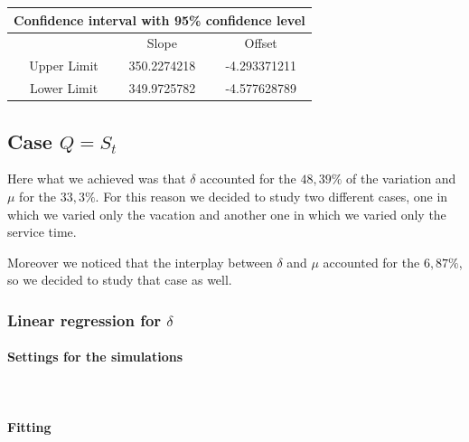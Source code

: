 \documentclass{article}
\begin{document}
                    \begin{table}[htbp]
                        \centering 
                        \begin{tabular}{|c|c|c|}
                            
                            \hline
                            \multicolumn{3}{|c|}{\bf Confidence interval with 95\% confidence level} \\
                            
                            \hline
                            \ & Slope & Offset\\
                            \hline
                            \ Upper Limit & 350.2274218 & -4.293371211 \\ 
                            \hline
                            \ Lower Limit & 349.9725782 & -4.577628789 \\ 
                            \hline
                        \end{tabular}
                        \label{table:CI_05_fitting}
                    \end{table}
    \newpage            
        \subsection{Case $Q = S_t$}
            Here what we achieved was that $\delta$ accounted for the $48,39\%$ of the variation and $\mu$ for the $33,3\%$. For this reason we decided to study two different cases, one in which we varied only the vacation and another one in which we varied only the service time.

            Moreover we noticed that the interplay between $\delta$ and $\mu$ accounted for the $6,87\%$, so we decided to study that case as well.
            
            \subsubsection{Linear regression for $\delta$}
                \paragraph{Settings for the simulations} \hfill \\
                    
                \paragraph{Fitting} \hfill \\
\end{document}
